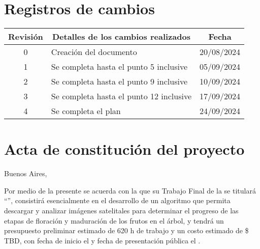 \documentclass[
11pt, %
]{charter}
\begin{document}
\maketitle
\thispagestyle{empty}
\pagebreak


\thispagestyle{empty}
{\setlength{\parskip}{0pt}
\tableofcontents{}
}
\pagebreak


\section*{Registros de cambios}
\label{sec:registro}


\begin{table}[ht]
\label{tab:registro}
\centering
\begin{tabularx}{\linewidth}{@{}|c|X|c|@{}}
\hline
\rowcolor[HTML]{C0C0C0} 
Revisión & \multicolumn{1}{c|}{\cellcolor[HTML]{C0C0C0}Detalles de los cambios realizados} & Fecha      \\ \hline
0      & Creación del documento                                & {20}/{08}/2024 \\ \hline
1      & Se completa hasta el punto 5 inclusive                & {05}/{09}/2024 \\ \hline
2      & Se completa hasta el punto 9 inclusive                & {10}/{09}/2024 \\ \hline
3      & Se completa hasta el punto 12 inclusive               & {17}/{09}/{2024} \\ \hline
4      & Se completa el plan	                               & {24}/{09}/{2024} \\ \hline


\end{tabularx}
\end{table}

\pagebreak



\section*{Acta de constitución del proyecto}
\label{sec:acta}

\begin{flushright}
Buenos Aires, \fechaInicioName
\end{flushright}

\vspace{2cm}

Por medio de la presente se acuerda con la \authorname\hspace{1px} que su Trabajo Final de la \degreename\hspace{1px} se 
titulará ``\ttitle'', consistirá esencialmente en el desarrollo de un algoritmo que permita descargar y analizar imágenes satelitales para 
determinar el progreso de las etapas de floración y maduración de los frutos en el árbol, y tendrá un presupuesto preliminar estimado de {620} h de trabajo y un costo estimado de
{\$ TBD}, con fecha de inicio el \fechaInicioName\hspace{1px} y fecha de presentación pública 
el \fechaFinalName.
\end{document}
